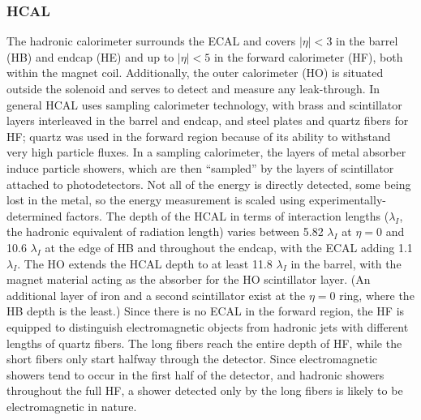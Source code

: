 \subsubsection{HCAL}
\label{exp:HCAL}
The hadronic calorimeter surrounds the ECAL and 
covers $|\eta| < 3$ in the barrel (HB) and endcap (HE) 
and up to $|\eta| < 5$ in the forward calorimeter (HF),
both within the magnet coil.
Additionally, the outer calorimeter (HO) is situated 
outside the solenoid and serves to detect 
and measure any leak-through.
In general HCAL uses sampling calorimeter technology, 
with brass and scintillator layers interleaved 
in the barrel and endcap, 
and steel plates and quartz fibers for HF; 
quartz was used in the forward region 
because of its ability to 
withstand very high particle fluxes.  
In a sampling calorimeter, the layers of metal absorber 
induce particle showers, which are then 
``sampled'' by the layers of scintillator 
attached to photodetectors.  
Not all of the energy is directly detected, 
some being lost in the metal,
so the energy measurement is scaled using 
experimentally-determined factors.  
The depth of the HCAL 
in terms of interaction lengths 
($\lambda_I$, the hadronic equivalent of radiation length) 
varies between 5.82 $\lambda_I$ at $\eta = 0$ and 
10.6 $\lambda_I$ at the edge of HB and throughout 
the endcap, 
with the ECAL adding 1.1 $\lambda_I$.  
The HO extends the HCAL depth to at least 
11.8 $\lambda_I$ in the barrel, 
with the magnet material acting as the absorber for 
the HO scintillator layer.  
(An additional layer of iron and 
a second scintillator exist
at the $\eta = 0$ ring, 
where the HB depth is the least.)
Since there is no ECAL in the forward region, 
the HF is equipped to distinguish electromagnetic 
objects from hadronic jets with different 
lengths of quartz fibers.  
The long fibers reach the entire depth of HF, 
while the short fibers only start halfway through 
the detector.
Since electromagnetic showers tend to occur in the 
first half of the detector, 
and hadronic showers throughout the full HF, 
a shower detected only by the long fibers 
is likely to be electromagnetic in nature.  


